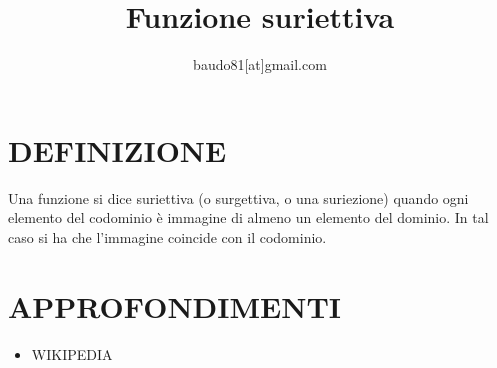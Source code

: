 \documentclass[a4paper,10pt]{article}
\title{Funzione suriettiva}
\author{baudo81[at]gmail.com}
\begin{document}
\maketitle

\section{DEFINIZIONE}
Una funzione si dice suriettiva (o surgettiva, o una suriezione) quando ogni elemento del codominio è immagine di almeno un elemento
del dominio. In tal caso si ha che l'immagine coincide con il codominio. \cite{wfunzsur}

\section{APPROFONDIMENTI}
\begin{itemize}
 \item WIKIPEDIA \cite{wfunzsur}
\end{itemize}



\end{document}
